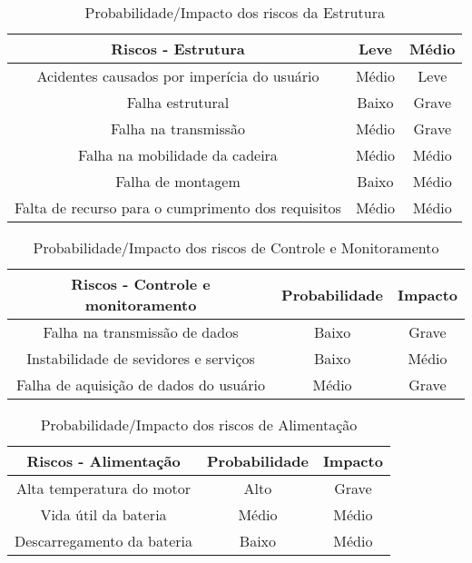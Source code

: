 \begin{table}[h]
\centering
\vspace{0.5cm}
\begin{tabular}{|c|c|c|}
\hline
Riscos - Estrutura    & Leve            & Médio          \\
\hline
Acidentes causados por imperícia do usuário         & Médio & Leve \\
Falha estrutural                                    & Baixo & Grave \\
Falha na transmissão                                & Médio & Grave \\
Falha na mobilidade da cadeira                      & Médio & Médio \\
Falha de montagem                                   & Baixo & Médio \\
Falta de recurso para o cumprimento dos requisitos  & Médio & Médio \\
\hline
\end{tabular}
\caption{Probabilidade/Impacto dos riscos da Estrutura}
\label{tab:probimpest}
\end{table}

\begin{table}[h]
\centering
\vspace{0.5cm}
\begin{tabular}{|c|c|c|}
\hline
Riscos - Controle e monitoramento       & Probabilidade & Impacto \\
\hline
Falha na transmissão de dados           & Baixo         & Grave \\
Instabilidade de sevidores e serviços   & Baixo         & Médio \\
Falha de aquisição de dados do usuário  & Médio         & Grave \\
\hline
\end{tabular}
\caption{Probabilidade/Impacto dos riscos de Controle e Monitoramento}
\label{tab:probimpcontrole}
\end{table}

\begin{table}[h]
\centering
\vspace{0.5cm}
\begin{tabular}{|c|c|c|}
\hline
Riscos - Alimentação        & Probabilidade & Impacto \\
\hline
Alta temperatura do motor   & Alto          & Grave \\
Vida útil da bateria        & Médio         & Médio \\
Descarregamento da bateria  & Baixo         & Médio \\
\hline
\end{tabular}
\caption{Probabilidade/Impacto dos riscos de Alimentação}
\label{tab:probimpalim}
\end{table}

